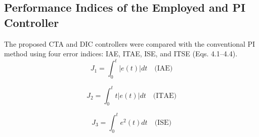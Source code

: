 \documentclass[preprint,12pt]{elsarticle}
\begin{document}
\subsection{Performance Indices of the Employed and PI Controller}
The proposed CTA and DIC controllers were compared with the conventional PI method using four error indices: IAE, ITAE, ISE, and ITSE (Eqs. 4.1–4.4). 
\begin{equation}
    J_1 = \int_{0}^{t} |e(t)| dt \quad \text{(IAE)}
\end{equation}

\begin{equation}
    J_2 = \int_{0}^{t} t |e(t)| dt \quad \text{(ITAE)}
\end{equation}

\begin{equation}
    J_3 = \int_{0}^{t} e^2(t) dt \quad \text{(ISE)}
\end{equation}
\end{document}
